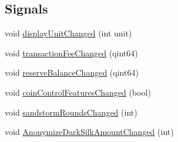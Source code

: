 \subsection*{Signals}
\begin{DoxyCompactItemize}
\item 
void \hyperlink{class_options_model_a7827a9cf0ceea0a429522974b620f11e}{display\+Unit\+Changed} (int unit)
\item 
void \hyperlink{class_options_model_a8145c6d4e61ea6f7d9b51904f55cec42}{transaction\+Fee\+Changed} (qint64)
\item 
void \hyperlink{class_options_model_a8e484d6f63c9f5265b8575e6f8743412}{reserve\+Balance\+Changed} (qint64)
\item 
void \hyperlink{class_options_model_a469ef5e28f59f5b633a2f17943527389}{coin\+Control\+Features\+Changed} (bool)
\item 
void \hyperlink{class_options_model_ae7cf4ddcaf8df54b8b6f09eda17d318b}{sandstorm\+Rounds\+Changed} (int)
\item 
void \hyperlink{class_options_model_aaf45c507548211484743e17f145c8f40}{Anonymize\+Dark\+Silk\+Amount\+Changed} (int)
\end{DoxyCompactItemize}
